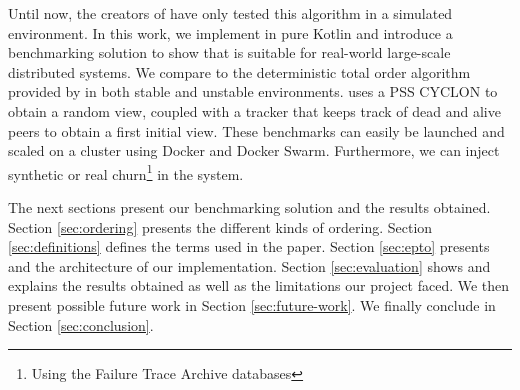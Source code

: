 Until now, the creators of \epto have only tested this algorithm in a simulated environment. In this work, we implement \epto in pure Kotlin and introduce a benchmarking solution to show that \epto is suitable for real-world large-scale distributed systems. We compare \epto to the deterministic total order algorithm provided by \jgroups \autocite{jgroups} in both stable and unstable environments. \epto uses a PSS CYCLON \autocite{Voulgaris2005} to obtain a random view, coupled with a tracker that keeps track of dead and alive peers to obtain a first initial view. These benchmarks can easily be launched and scaled on a cluster using Docker and Docker Swarm. Furthermore, we can inject synthetic or real churn\footnote{Using the Failure Trace Archive databases} in the system.
\par
The next sections present our benchmarking solution and the results obtained. Section \ref{sec:ordering} presents the different kinds of ordering. Section \ref{sec:definitions} defines the terms used in the paper. Section \ref{sec:epto} presents \epto and the architecture of our implementation. Section \ref{sec:evaluation} shows and explains the results obtained as well as the limitations our project faced. We then present possible future work in Section \ref{sec:future-work}. We finally conclude in Section \ref{sec:conclusion}.
